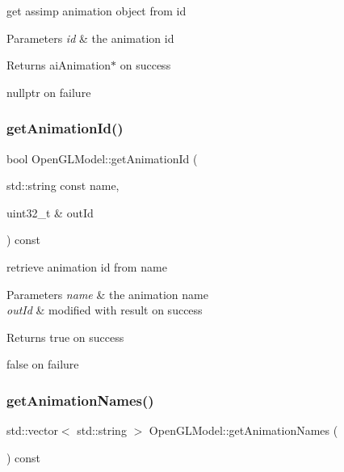 get assimp animation object from id 


\begin{DoxyParams}{Parameters}
{\em id} & the animation id \\
\hline
\end{DoxyParams}
\begin{DoxyReturn}{Returns}
ai\+Animation$\ast$ on success 

nullptr on failure 
\end{DoxyReturn}
\mbox{\label{class_open_g_l_model_a0865d7d0a93f9972a99dc0a60ad142db}} 
\subsubsection{\texorpdfstring{get\+Animation\+Id()}{getAnimationId()}}
{\footnotesize\ttfamily bool Open\+G\+L\+Model\+::get\+Animation\+Id (\begin{DoxyParamCaption}\item[{std\+::string const}]{name,  }\item[{uint32\+\_\+t \&}]{out\+Id }\end{DoxyParamCaption}) const}



retrieve animation id from name 


\begin{DoxyParams}{Parameters}
{\em name} & the animation name \\
\hline
{\em out\+Id} & modified with result on success \\
\hline
\end{DoxyParams}
\begin{DoxyReturn}{Returns}
true on success 

false on failure 
\end{DoxyReturn}
\mbox{\label{class_open_g_l_model_a5627bd93c06f92a7759691854b23d290}} 
\subsubsection{\texorpdfstring{get\+Animation\+Names()}{getAnimationNames()}}
{\footnotesize\ttfamily std\+::vector$<$ std\+::string $>$ Open\+G\+L\+Model\+::get\+Animation\+Names (\begin{DoxyParamCaption}{ }\end{DoxyParamCaption}) const}



